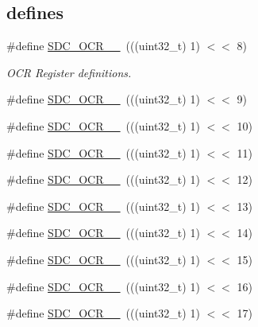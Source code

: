 \subsection*{\textquotesingle{}defines\textquotesingle{}}
\begin{DoxyCompactItemize}
\item 
\#define \hyperlink{group___c_h_i_p___s_d_m_m_c___definitions_ga22f9a95fb2cb0b0442a8e15e85c02309}{S\+D\+C\+\_\+\+O\+C\+R\+\_\+\_}~(((uint32\+\_\+t) 1) $<$$<$ 8)
\begin{DoxyCompactList}\small\item\em O\+CR Register definitions. \end{DoxyCompactList}\item 
\#define \hyperlink{group___c_h_i_p___s_d_m_m_c___definitions_ga4859335686cfb475044c3f295e22ad41}{S\+D\+C\+\_\+\+O\+C\+R\+\_\+\_}~(((uint32\+\_\+t) 1) $<$$<$ 9)
\item 
\#define \hyperlink{group___c_h_i_p___s_d_m_m_c___definitions_ga89420303e5206b28f7f7fe9d712682dc}{S\+D\+C\+\_\+\+O\+C\+R\+\_\+\_}~(((uint32\+\_\+t) 1) $<$$<$ 10)
\item 
\#define \hyperlink{group___c_h_i_p___s_d_m_m_c___definitions_gad6d151374e65c4ec33ae2cd44e2da6bc}{S\+D\+C\+\_\+\+O\+C\+R\+\_\+\_}~(((uint32\+\_\+t) 1) $<$$<$ 11)
\item 
\#define \hyperlink{group___c_h_i_p___s_d_m_m_c___definitions_gaa3d37d5080f2b5ac3a627a684fae00ad}{S\+D\+C\+\_\+\+O\+C\+R\+\_\+\_}~(((uint32\+\_\+t) 1) $<$$<$ 12)
\item 
\#define \hyperlink{group___c_h_i_p___s_d_m_m_c___definitions_ga6cac4e4e0b70df4e109de1dca8af1726}{S\+D\+C\+\_\+\+O\+C\+R\+\_\+\_}~(((uint32\+\_\+t) 1) $<$$<$ 13)
\item 
\#define \hyperlink{group___c_h_i_p___s_d_m_m_c___definitions_ga1c71bab9362e057b2b3bb0bd515c0932}{S\+D\+C\+\_\+\+O\+C\+R\+\_\+\_}~(((uint32\+\_\+t) 1) $<$$<$ 14)
\item 
\#define \hyperlink{group___c_h_i_p___s_d_m_m_c___definitions_ga3b86b17c962cfd53a506a5cdf66d6d80}{S\+D\+C\+\_\+\+O\+C\+R\+\_\+\_}~(((uint32\+\_\+t) 1) $<$$<$ 15)
\item 
\#define \hyperlink{group___c_h_i_p___s_d_m_m_c___definitions_ga2216100efbb6771651505ef3e52cd8de}{S\+D\+C\+\_\+\+O\+C\+R\+\_\+\_}~(((uint32\+\_\+t) 1) $<$$<$ 16)
\item 
\#define \hyperlink{group___c_h_i_p___s_d_m_m_c___definitions_gaca5e2d08e3ca92f47754e682ca33b3fa}{S\+D\+C\+\_\+\+O\+C\+R\+\_\+\_}~(((uint32\+\_\+t) 1) $<$$<$ 17)

\end{DoxyCompactItemize}
